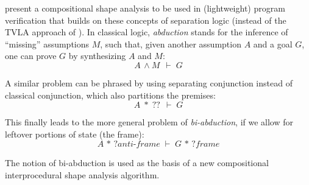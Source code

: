 
\citeauthor{popl/CalcagnoDOY09} present a compositional shape analysis
\cite{popl/CalcagnoDOY09} to be used in (lightweight) program
verification that builds on these concepts of separation logic
(instead of the TVLA approach of \citeauthor{popl/SagivRW99}). In
classical logic, \emph{abduction} stands for the inference of
``missing'' assumptions \(M\), such that, given another assumption
\(A\) and a goal \(G\), one can prove \(G\) by synthesizing \(A\) and
\(M\):
\[A \,\land M\, \;\vdash\; G \]

A similar problem can be phrased by using separating conjunction
instead of classical conjunction, which also partitions the premises:
\[A \;*\; ??\, \;\vdash\; G \]

This finally leads to the more general problem of \emph{bi-abduction},
if we allow for leftover portions of state (the frame):
\[A \,*\, \textit{?anti-frame} \;\vdash\; G \,*\, \textit{?frame} \]

The notion of bi-abduction is used as the basis of a new compositional
interprocedural shape analysis algorithm.



